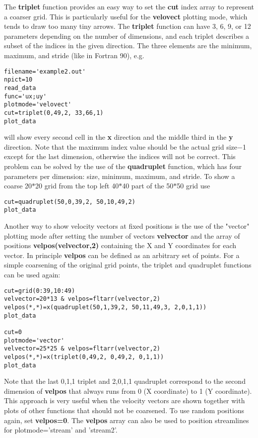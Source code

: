\documentclass{article}
\begin{document}
   The {\bf triplet} function provides an easy way to set the {\bf cut} 
   index array to represent a coarser grid. This is particularly useful
   for the {\bf velovect} plotting mode, which tends to draw too many tiny arrows.
   The {\bf triplet} function can have 3, 6, 9, or 12 parameters depending on 
   the number of dimensions, and each triplet describes a subset of the 
   indices in the given direction. The three elements are the 
   minimum, maximum, and stride (like in Fortran 90), e.g. 
\begin{verbatim}
filename='example2.out'
npict=10
read_data
func='ux;uy'
plotmode='velovect'
cut=triplet(0,49,2, 33,66,1)
plot_data
\end{verbatim}
   will show every second cell in the {\bf x} direction and the middle third 
   in the {\bf y} direction. Note that the maximum index value should be
   the actual grid size$-$1 except for the last dimension, otherwise the 
   indices will not be correct. This problem can be solved by the use of the 
   {\bf quadruplet} function, which has four parameters per dimension:
   size, minimum, maximum, and stride. To show a coarse 20$*$20 grid 
   from the top left 40$*$40 part of the 50$*$50 grid use
\begin{verbatim}
cut=quadruplet(50,0,39,2, 50,10,49,2)
plot_data
\end{verbatim}
   Another way to show velocity vectors at fixed positions is the use of 
   the "vector" plotting mode after setting the number of vectors {\bf velvector} 
   and the array of positions {\bf velpos(velvector,2)} containing the 
   X and Y coordinates for each vector. In principle {\bf velpos} can
   be defined as an arbitrary set of points.
   For a simple coarsening of the original grid points, the triplet and 
   quadruplet functions can be used again:
\begin{verbatim}
cut=grid(0:39,10:49)
velvector=20*13 & velpos=fltarr(velvector,2)
velpos(*,*)=x(quadruplet(50,1,39,2, 50,11,49,3, 2,0,1,1))
plot_data

cut=0
plotmode='vector'
velvector=25*25 & velpos=fltarr(velvector,2)
velpos(*,*)=x(triplet(0,49,2, 0,49,2, 0,1,1))
plot_data
\end{verbatim}
   Note that the last 0,1,1 triplet and 2,0,1,1 quadruplet correspond to
   the second dimension of {\bf velpos} that always runs from 
   0 (X coordinate) to 1 (Y coordinate). This approach is very useful when 
   the velocity vectors are shown together with plots of other functions 
   that should not be coarsened. To use random positions again, 
   set {\bf velpos=0}.
   The {\bf velpos} array can also be used to position streamlines for 
   plotmode='stream' and 'stream2'.
\end{document}
